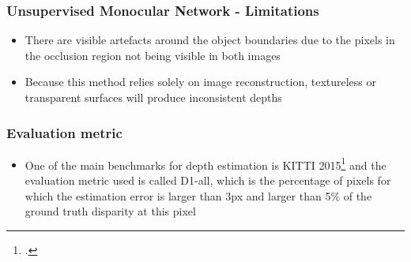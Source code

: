 \documentclass{beamer}
\begin{document}
\begin{frame}
\frametitle{Unsupervised Monocular Network - Limitations}
\center
\begin{itemize}
	\item There are visible artefacts around the object boundaries due to the pixels in the occlusion region not being visible in both images
	\item Because this method relies solely on image reconstruction, textureless or transparent surfaces will produce inconsistent depths
\end{itemize}
\end{frame}

\begin{frame}
\frametitle{Evaluation metric}
\center
\begin{itemize}
	\item One of the main benchmarks for depth estimation is KITTI 2015\footcite{Menze2015CVPR} and the evaluation metric used is called D1-all, which is the percentage of pixels for which the estimation error is larger than 3px and larger than 5\% of the ground truth disparity at this pixel
\end{itemize}
\end{frame}
\end{document}
